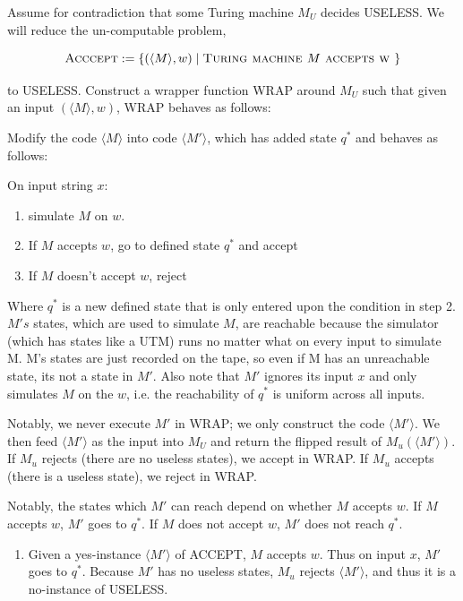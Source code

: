 \documentclass[12pt]{article}
\begin{document}
\begin{solution}
    \bbni

    Assume for contradiction that some Turing machine $M_{U}$ decides USELESS. We will reduce the un-computable problem,
    
    \[
    \textsc{Acccept} := \{(\langle M \rangle, w) \mid \textsc{Turing machine } M \textsc{ accepts w }\}
    \]
    
    to USELESS. Construct a wrapper function WRAP around $M_{U}$ such that given an input $(\langle M \rangle, w)$, WRAP behaves as follows:
    
    Modify the code $\langle M \rangle$ into code $\langle M' \rangle$, which has added state $q^*$ and behaves as follows:
    
    \begin{tcolorbox}[
        colframe=blue!30!black, 
        arc=0mm,
        boxrule=1pt
    ]
    On input string $x$:
    \begin{enumerate}
        \item simulate $M$ on $w$. 
        \item If $M$ accepts $w$, go to defined state $q^*$ and accept
        \item If $M$ doesn't accept $w$, reject
    \end{enumerate}
    Where $q^*$ is a new defined state that is only entered upon the condition in step 2. $M's$ states, which are used to simulate $M$, are reachable because the simulator (which has states like a UTM) runs no matter what on every input to simulate M. M's states are just recorded on the tape, so even if M has an unreachable state, its not a state in $M'$. Also note that $M'$ ignores its input $x$ and only simulates $M$ on the $w$, i.e. the reachability of $q^*$ is uniform across all inputs. 
    \end{tcolorbox}
    
    Notably, we never execute $M'$ in WRAP; we only construct the code $\langle M' \rangle$. We then feed $\langle M' \rangle$ as the input into $M_U$ and return the flipped result of $M_u(\langle M' \rangle)$. If $M_u$ rejects (there are no useless states), we accept in WRAP. If $M_u$ accepts (there is a useless state), we reject in WRAP.
    
    Notably, the states which $M'$ can reach depend on whether $M$ accepts $w$. If $M$ accepts $w$, $M'$ goes to $q^*$. If $M$ does not accept $w$, $M'$ does not reach $q^*$.
    
    \begin{enumerate}
        \item Given a yes-instance $\langle M' \rangle$ of ACCEPT, $M$ accepts $w$. Thus on input $x$, $M'$ goes to $q^*$. Because $M'$ has no useless states, $M_u$ rejects $\langle M' \rangle$, and thus it is a no-instance of USELESS.
    

\end{enumerate}
\end{solution}
\end{document}

